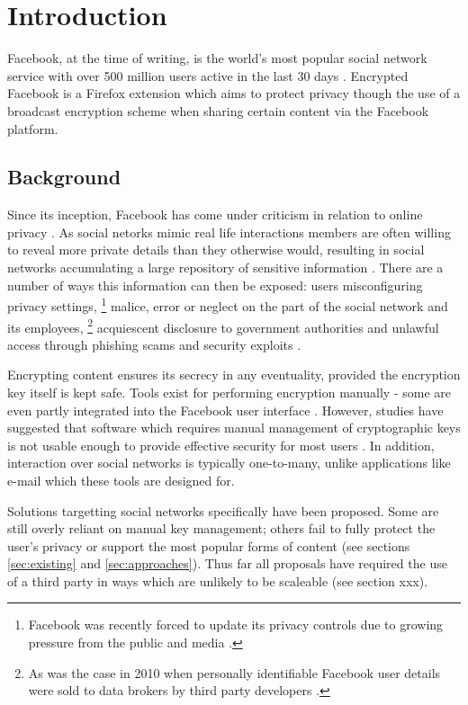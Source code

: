 \chapter{Introduction}\label{ch:introduction}

Facebook, at the time of writing, is the world's most popular social network service with over 500 million users active in the last 30 days \cite{fb-factsheet}. Encrypted Facebook is a Firefox extension which aims to protect privacy though the use of a broadcast encryption scheme when sharing certain content via the Facebook platform.


\section{Background}
\label{sec:background}

Since its inception, Facebook has come under criticism in relation to online privacy \cite{fb-cipc}. As social netorks mimic real life interactions members are often willing to reveal more private details than they otherwise would, resulting in social networks accumulating a large repository of sensitive information \cite{gross}. There are a number of ways this information can then be exposed: users misconfiguring privacy settings, \footnote{Facebook was recently forced to update its privacy controls due to growing pressure from the public and media \cite{fb-priv}.} malice, error or neglect on the part of the social network and its employees, \footnote{As was the case in 2010 when personally identifiable Facebook user details were sold to data brokers by third party developers \cite{fb-ids}.} acquiescent disclosure to government authorities and unlawful access through phishing scams and security exploits \cite{snoop} \cite{fb-gov} \cite{fb-phish} \cite{rockyou}.

Encrypting content ensures its secrecy in any eventuality, provided the encryption key itself is kept safe. Tools exist for performing encryption manually - some are even partly integrated into the Facebook user interface \cite{firegpg}. However, studies have suggested that software which requires manual management of cryptographic keys is not usable enough to provide effective security for most users \cite{johhny}. In addition, interaction over social networks is typically one-to-many, unlike applications like e-mail which these tools are designed for.

Solutions targetting social networks specifically have been proposed. Some are still overly reliant on manual key management; others fail to fully protect the user's privacy or support the most popular forms of content (see sections \ref{sec:existing} and \ref{sec:approaches}). Thus far all proposals have required the use of a third party in ways which are unlikely to be scaleable (see section xxx). 
  
